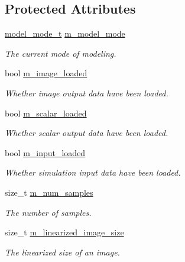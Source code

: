 \subsection*{Protected Attributes}
\begin{DoxyCompactItemize}
\item 
\hyperlink{classlbann_1_1data__reader__jag_a114c369c8604df385cf7a3ec20c9739b}{model\+\_\+mode\+\_\+t} \hyperlink{classlbann_1_1data__reader__jag_a877eb1f0eb2afccd73cd7d69407ff6e2}{m\+\_\+model\+\_\+mode}
\begin{DoxyCompactList}\small\item\em The current mode of modeling. \end{DoxyCompactList}\item 
bool \hyperlink{classlbann_1_1data__reader__jag_a3f1691818996f73dc918dfd0e8f98a70}{m\+\_\+image\+\_\+loaded}
\begin{DoxyCompactList}\small\item\em Whether image output data have been loaded. \end{DoxyCompactList}\item 
bool \hyperlink{classlbann_1_1data__reader__jag_add9f037609b73da931a4a8a460798db9}{m\+\_\+scalar\+\_\+loaded}
\begin{DoxyCompactList}\small\item\em Whether scalar output data have been loaded. \end{DoxyCompactList}\item 
bool \hyperlink{classlbann_1_1data__reader__jag_ae047bbae82c4a8eceedceeea2e1815ad}{m\+\_\+input\+\_\+loaded}
\begin{DoxyCompactList}\small\item\em Whether simulation input data have been loaded. \end{DoxyCompactList}\item 
size\+\_\+t \hyperlink{classlbann_1_1data__reader__jag_a25ceffff7e8d6641e785efa033530011}{m\+\_\+num\+\_\+samples}
\begin{DoxyCompactList}\small\item\em The number of samples. \end{DoxyCompactList}\item 
size\+\_\+t \hyperlink{classlbann_1_1data__reader__jag_a7c2aa5f489e7c7a3236c1f6c4a760048}{m\+\_\+linearized\+\_\+image\+\_\+size}
\begin{DoxyCompactList}\small\item\em The linearized size of an image. \end{DoxyCompactList}\item 

\end{DoxyCompactItemize}
